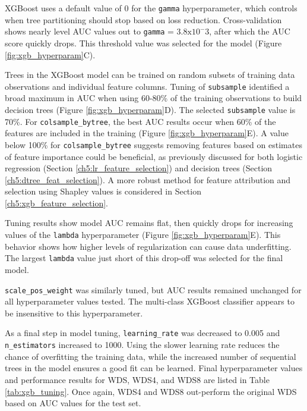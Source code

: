 XGBoost uses a default value of 0 for the \verb|gamma| hyperparameter, which controls when tree partitioning should stop based on loss reduction. Cross-validation shows nearly level AUC values out to \verb|gamma| = $3.8 \text{x} 10^-3$, after which the AUC score quickly drops. This threshold value was selected for the model (Figure \ref{fig:xgb_hyperparam}C).

Trees in the XGBoost model can be trained on random subsets of training data observations and individual feature columns. Tuning of \verb|subsample| identified a broad maximum in AUC when using 60-80\% of the training observations to build decision trees (Figure \ref{fig:xgb_hyperparam}D). The selected \verb|subsample| value is 70\%. For \verb|colsample_bytree|, the best AUC results occur when 60\% of the features are included in the training (Figure \ref{fig:xgb_hyperparam}E). A value below 100\% for \verb|colsample_bytree| suggests removing features based on estimates of feature importance could be beneficial, as previously discussed for both logistic regression (Section \ref{ch5:lr_feature_selection}) and decision trees (Section \ref{ch5:dtree_feat_selection}). A more robust method for feature attribution and selection using Shapley values is considered in Section \ref{ch5:xgb_feature_selection}.

Tuning results show model AUC remains flat, then quickly drops for increasing values of the \verb|lambda| hyperparameter (Figure \ref{fig:xgb_hyperparam}E). This behavior shows how higher levels of regularization can cause data underfitting. The largest \verb|lambda| value just short of this drop-off was selected for the final model.

\verb|scale_pos_weight| was similarly tuned, but AUC results remained unchanged for all hyperparameter values tested. The multi-class XGBoost classifier appears to be insensitive to this hyperparameter.

As a final step in model tuning, \verb|learning_rate| was decreased to 0.005 and \verb|n_estimators| increased to 1000.  Using the slower learning rate reduces the chance of overfitting the training data, while the increased number of sequential trees in the model ensures a good fit can be learned. 
Final hyperparameter values and performance results for WDS, WDS4, and WDS8 are listed in Table \ref{tab:xgb_tuning}. Once again, WDS4 and WDS8 out-perform the original WDS based on AUC values for the test set.

